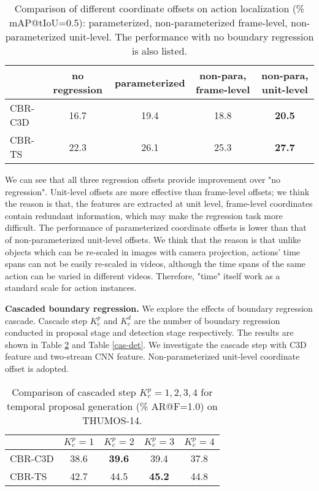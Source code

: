 \documentclass{bmvc2k}
\begin{document}
\begin{table}[h]\small
\centering
\caption{Comparison of different coordinate offsets on action localization (\% mAP@tIoU=0.5): parameterized, non-parameterized frame-level, non-parameterized unit-level. The performance with no boundary regression is also listed.}
\label{offset}
\begin{tabular}{l|c|c|c|c}
\hline
          & no regression & \multicolumn{1}{c|}{parameterized} & \multicolumn{1}{c|}{non-para, frame-level} & \multicolumn{1}{c}{non-para, unit-level} \\ \hline
CBR-C3D  &      16.7         &        19.4           &          18.8         &      \textbf{20.5}            \\ \hline
CBR-TS &      22.3         &      26.1        &          25.3           &   \textbf{27.7}         \\ \hline
\end{tabular}
\end{table}

We can see that all three regression offsets provide improvement over "no regression". Unit-level offsets are more effective than frame-level offsets; we think the reason is that, the features are extracted at unit level, frame-level coordinates contain redundant information, which may make the regression task more difficult. The performance of parameterized coordinate offsets is lower than that of non-parameterized unit-level offsets. We think that the reason is that unlike objects which can be re-scaled in images with camera projection, actions' time spans can not be easily re-scaled in videos, although the time spans of the same action can be varied in different videos. Therefore, "time" itself work as a standard scale for action instances.

\textbf{Cascaded boundary regression.} We explore the effects of boundary regression cascade. Cascade step $K_c^p$ and $K_c^d$ are the number of boundary regression conducted in proposal stage and detection stage respectively. The results are shown in Table \ref{cas-prop} and Table \ref{cas-det}. We investigate the cascade step with C3D feature and two-stream CNN feature. Non-parameterized unit-level coordinate offset is adopted.


\begin{table}[h]\small
\centering
\caption{Comparison of cascaded step $K_c^p = 1,2,3,4 $ for temporal proposal generation (\% AR@F=1.0) on THUMOS-14.}
\label{cas-prop}
\begin{tabular}{l|c|c|c|c}
\hline
           & $K_c^p=1$ & \multicolumn{1}{c|}{$K_c^p=2$} & \multicolumn{1}{c|}{$K_c^p=3$} & \multicolumn{1}{c}{$K_c^p=4$} \\ \hline
CBR-C3D        &   38.6  &      \textbf{39.6}      &       39.4       &     37.8      \\ \hline
CBR-TS &   42.7  &      44.5   &        \textbf{45.2}      &        44.8       \\ \hline
\end{tabular}
\end{table}
\end{document}
